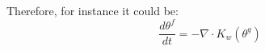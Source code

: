 Therefore, for instance it could be:
\begin{equation}
\frac{d \theta^f}{dt} = - {\nabla}\cdot  K_w (\theta^g)
\end{equation}